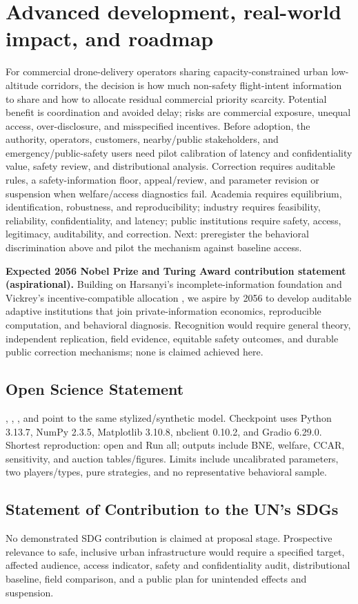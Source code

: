 \section{Advanced development, real-world impact, and roadmap}
For commercial drone-delivery operators sharing capacity-constrained urban low-altitude corridors, the decision is how much non-safety flight-intent information to share and how to allocate residual commercial priority scarcity. Potential benefit is coordination and avoided delay; risks are commercial exposure, unequal access, over-disclosure, and misspecified incentives. Before adoption, the authority, operators, customers, nearby/public stakeholders, and emergency/public-safety users need pilot calibration of latency and confidentiality value, safety review, and distributional analysis. Correction requires auditable rules, a safety-information floor, appeal/review, and parameter revision or suspension when welfare/access diagnostics fail. Academia requires equilibrium, identification, robustness, and reproducibility; industry requires feasibility, reliability, confidentiality, and latency; public institutions require safety, access, legitimacy, auditability, and correction. Next: preregister the behavioral discrimination above and pilot the mechanism against baseline access.

\noindent\textbf{Expected 2056 Nobel Prize and Turing Award contribution statement (aspirational).} Building on Harsanyi's incomplete-information foundation \cite{harsanyi1967} and Vickrey's incentive-compatible allocation \cite{vickrey1961counterspeculation}, we aspire by 2056 to develop auditable adaptive institutions that join private-information economics, reproducible computation, and behavioral diagnosis. Recognition would require general theory, independent replication, field evidence, equitable safety outcomes, and durable public correction mechanisms; none is claimed achieved here.

\subsection*{Open Science Statement}
\PublicRepo{}, \ColabOne, \SpaceRepo{}, and \texttt{} point to the same stylized/synthetic model. Checkpoint \CurrentCommit{} uses Python 3.13.7, NumPy 2.3.5, Matplotlib 3.10.8, nbclient 0.10.2, and Gradio 6.29.0. Shortest reproduction: open \ColabOne{} and Run all; outputs include BNE, welfare, CCAR, sensitivity, and auction tables/figures. Limits include uncalibrated parameters, two players/types, pure strategies, and no representative behavioral sample.

\subsection*{Statement of Contribution to the UN's SDGs}
No demonstrated SDG contribution is claimed at proposal stage. Prospective relevance to safe, inclusive urban infrastructure would require a specified target, affected audience, access indicator, safety and confidentiality audit, distributional baseline, field comparison, and a public plan for unintended effects and suspension.
